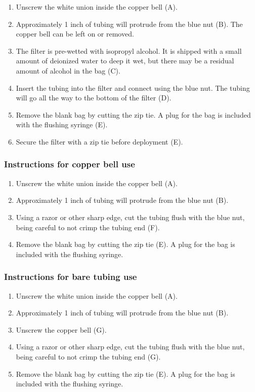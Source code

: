 \begin{enumerate}
\item
Unscrew the white union inside the copper bell (A).
\item
Approximately 1 inch of tubing will protrude from the blue nut (B).  The copper bell can be left on or removed.
\item 
The filter is pre-wetted with isopropyl alcohol.  It is shipped with a small amount of deionized water to deep it wet, but there may be a residual amount of alcohol in the bag (C).
\item
Insert the tubing into the filter and connect using the blue nut.  The tubing will go all the way to the bottom of the filter (D).
\item
Remove the blank bag by cutting the zip tie.  A plug for the bag is included with the flushing syringe (E).
\item
Secure the filter with a zip tie before deployment (E).
\end{enumerate}


\subsubsection{Instructions for copper bell use}

\begin{enumerate}
\item
Unscrew the white union inside the copper bell (A).
\item
Approximately 1 inch of tubing will protrude from the blue nut (B).
\item
Using a razor or other sharp edge, cut the tubing flush with the blue nut, being careful to not crimp the tubing end (F).
\item
Remove the blank bag by cutting the zip tie (E).  A plug for the bag is included with the flushing syringe.
\end{enumerate}


\subsubsection{Instructions for bare tubing use}

\begin{enumerate}
\item
Unscrew the white union inside the copper bell (A).
\item
Approximately 1 inch of tubing will protrude from the blue nut (B).
\item
Unscrew the copper bell (G).
\item
Using a razor or other sharp edge, cut the tubing flush with the blue nut, being careful to not crimp the tubing end (G).
\item
Remove the blank bag by cutting the zip tie (E).  A plug for the bag is included with the flushing syringe.
\end{enumerate}

